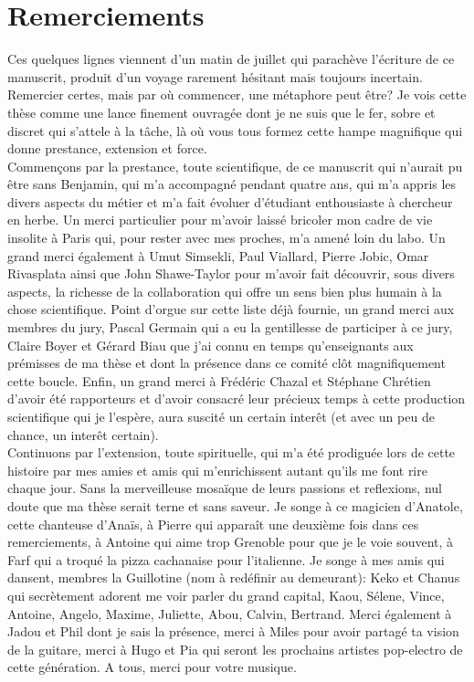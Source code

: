 \section*{Remerciements}

Ces quelques lignes viennent d'un matin de juillet qui parachève l'écriture de ce manuscrit, produit d'un voyage rarement hésitant mais toujours incertain.  
Remercier certes, mais par où commencer, une métaphore peut être? Je vois cette thèse comme une lance finement ouvragée dont je ne suis que le fer, sobre et discret qui s'attele à la tâche, là où vous tous formez cette hampe magnifique qui donne prestance, extension et force.\\
Commençons par la prestance, toute scientifique, de ce manuscrit qui n'aurait pu être sans Benjamin, qui m'a accompagné pendant quatre ans, qui m'a appris les divers aspects du métier et m'a fait évoluer d'étudiant enthousiaste à chercheur en herbe. Un merci particulier pour m'avoir laissé bricoler mon cadre de vie insolite à Paris qui, pour rester avec mes proches, m'a amené loin du labo. Un grand merci également à Umut Simsekli, Paul Viallard, Pierre Jobic, Omar Rivasplata ainsi que John Shawe-Taylor pour m'avoir fait découvrir, sous divers aspects, la richesse de la collaboration qui offre un sens bien plus humain à la chose scientifique. Point d'orgue sur cette liste déjà fournie, un grand merci aux membres du jury, Pascal Germain qui a eu la gentillesse de participer à ce jury, Claire Boyer et Gérard Biau que j'ai connu en temps qu'enseignants aux prémisses de ma thèse et dont la présence dans ce comité clôt magnifiquement cette boucle. Enfin, un grand merci à Frédéric Chazal et Stéphane Chrétien d'avoir été rapporteurs et d'avoir consacré leur précieux temps à cette production scientifique qui je l'espère, aura suscité un certain interêt (et avec un peu de chance, un interêt certain).\\
Continuons par l'extension, toute spirituelle, qui m'a été prodiguée lors de cette histoire par mes amies et amis qui m'enrichissent autant qu'ils me font rire chaque jour. Sans la merveilleuse mosaïque de leurs passions et reflexions, nul doute que ma thèse serait terne et sans saveur. Je songe à ce magicien d'Anatole, cette chanteuse d'Anaïs, à Pierre qui apparaît une deuxième fois dans ces remerciements, à Antoine qui aime trop Grenoble pour que je le voie souvent, à Farf qui a troqué la pizza cachanaise pour l'italienne. Je songe à mes amis qui dansent, membres la Guillotine (nom à redéfinir au demeurant): Keko et Chanus qui secrètement adorent me voir parler du grand capital, Kaou, Sélene, Vince, Antoine, Angelo, Maxime, Juliette, Abou, Calvin, Bertrand. Merci également à Jadou et Phil dont je sais la présence, merci à Miles pour avoir partagé ta vision de la guitare, merci à Hugo et Pia qui seront les prochains artistes pop-electro de cette génération. A tous, merci pour votre musique. 
